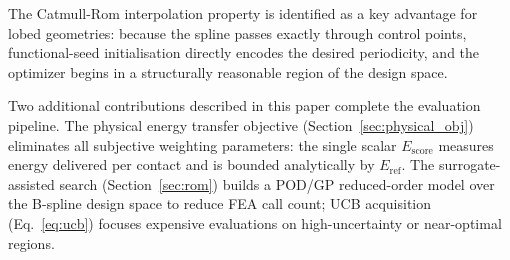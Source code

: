 \documentclass[10pt,twocolumn]{article}
\begin{document}
The Catmull-Rom interpolation property is identified as a key advantage for
lobed geometries: because the spline passes exactly through control points,
functional-seed initialisation directly encodes the desired periodicity, and
the optimizer begins in a structurally reasonable region of the design space.

Two additional contributions described in this paper complete the evaluation
pipeline.  The physical energy transfer objective (Section~\ref{sec:physical_obj})
eliminates all subjective weighting parameters: the single scalar $E_{\mathrm{score}}$
measures energy delivered per contact and is bounded analytically by $E_{\mathrm{ref}}$.
The surrogate-assisted search (Section~\ref{sec:rom}) builds a POD/GP reduced-order
model over the B-spline design space to reduce FEA call count; UCB acquisition
(Eq.~\ref{eq:ucb}) focuses expensive evaluations on high-uncertainty or near-optimal
regions.
\end{document}
